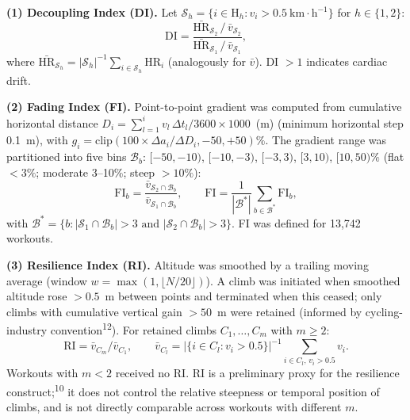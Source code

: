 \documentclass[12pt]{article}
\begin{document}
\textbf{(1) Decoupling Index (DI).} Let $\mathcal{S}_h = \{i \in
\mathrm{H}_h : v_i > 0.5~\mathrm{km{\cdot}h^{-1}}\}$ for $h\in\{1,2\}$:
\begin{equation}
  \mathrm{DI} = \frac{\bar{\mathrm{HR}}_{\mathcal{S}_2}\,/\,\bar{v}_{\mathcal{S}_2}}
                     {\bar{\mathrm{HR}}_{\mathcal{S}_1}\,/\,\bar{v}_{\mathcal{S}_1}},
  \label{eq:di}
\end{equation}
where $\bar{\mathrm{HR}}_{\mathcal{S}_h}=|\mathcal{S}_h|^{-1}\sum_{i\in\mathcal{S}_h}\mathrm{HR}_i$
(analogously for $\bar v$). DI $>1$ indicates cardiac drift.

\textbf{(2) Fading Index (FI).} Point-to-point gradient was computed from
cumulative horizontal distance $D_i=\sum_{l=1}^{i} v_l\,\Delta t_l/3600
\times 1000$~(m) (minimum horizontal step 0.1~m), with $g_i=\mathrm{clip}
(100\times\Delta a_i/\Delta D_i, -50, +50)\%$. The gradient range was
partitioned into five bins $\mathcal{B}_b$: $[-50,-10)$, $[-10,-3)$,
$[-3,3)$, $[3,10)$, $[10,50)\%$ (flat $<3\%$; moderate 3--10\%; steep
$>10\%$):
\begin{equation}
  \mathrm{FI}_b=\frac{\bar v_{\mathcal{S}_2\cap\mathcal{B}_b}}{\bar v_{\mathcal{S}_1\cap\mathcal{B}_b}},
  \qquad
  \mathrm{FI}=\frac{1}{|\mathcal{B}^*|}\sum_{b\in\mathcal{B}^*}\mathrm{FI}_b,
  \label{eq:fi}
\end{equation}
with $\mathcal{B}^*=\{b:|\mathcal{S}_1\cap\mathcal{B}_b|>3 \text{ and }
|\mathcal{S}_2\cap\mathcal{B}_b|>3\}$. FI was defined for 13,742 workouts.

\textbf{(3) Resilience Index (RI).} Altitude was smoothed by a trailing
moving average (window $w=\max(1,\lfloor N/20\rfloor)$). A climb was
initiated when smoothed altitude rose $>0.5$~m between points and
terminated when this ceased; only climbs with cumulative vertical gain
$>50$~m were retained (informed by cycling-industry
convention\textsuperscript{12}). For retained climbs $C_1,\dots,C_m$ with
$m\geq2$:
\begin{equation}
  \mathrm{RI}=\bar v_{C_m}/\bar v_{C_1},\qquad
  \bar v_{C_l}=|\{i\in C_l:v_i>0.5\}|^{-1}\!\!\sum_{i\in C_l,\,v_i>0.5}\!\! v_i.
  \label{eq:ri}
\end{equation}
Workouts with $m<2$ received no RI. RI is a preliminary proxy for the
resilience construct;\textsuperscript{10} it does not control the relative
steepness or temporal position of climbs, and is not directly comparable
across workouts with different $m$.
\end{document}
